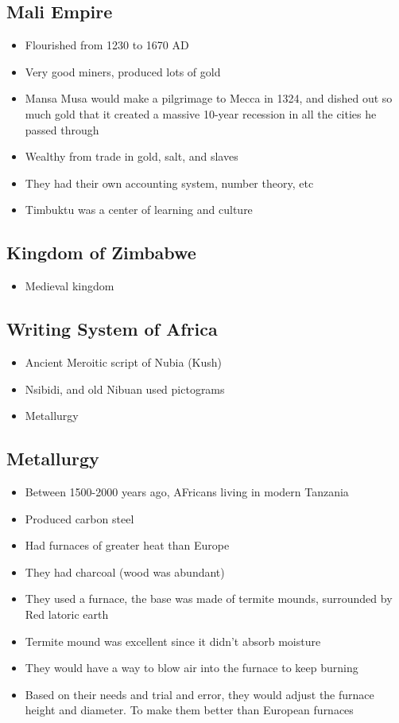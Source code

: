 \documentclass{article}
\begin{document}
\subsection{Mali Empire}
\begin{itemize}
  \item Flourished from 1230 to 1670 AD
  \item Very good miners, produced lots of gold
  \item Mansa Musa would make a pilgrimage to Mecca in 1324,
    and dished out so much gold that it created a massive
    10-year recession in all the cities he passed through
  \item Wealthy from trade in gold, salt, and slaves
  \item They had their own accounting system, number theory, etc
  \item Timbuktu was a center of learning and culture
\end{itemize}

\subsection{Kingdom of Zimbabwe}
\begin{itemize}
  \item Medieval kingdom
\end{itemize}

\subsection{Writing System of Africa}
\begin{itemize}
  \item Ancient Meroitic script of Nubia (Kush)
  \item Nsibidi, and old Nibuan used pictograms
  \item Metallurgy
\end{itemize}

\subsection{Metallurgy}
\begin{itemize}
  \item Between 1500-2000 years ago, AFricans living in modern Tanzania
  \item Produced carbon steel
  \item Had furnaces of greater heat than Europe
  \item They had charcoal (wood was abundant)
  \item They used a furnace,
    the base was made of termite mounds,
    surrounded by Red latoric earth
  \item Termite mound was excellent since it didn't absorb moisture
  \item They would have a way to blow air into the furnace to keep burning
  \item Based on their needs and trial and error, they would
    adjust the furnace height and diameter.
    To make them better than European furnaces
\end{itemize}
\end{document}

